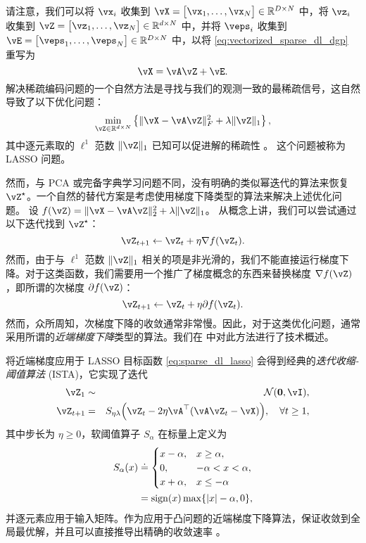 \documentclass[../../book-main.tex]{subfiles}
\begin{document}
请注意，我们可以将 \(\vx_{i}\) 收集到 \(\vX = \mat{\vx_{1}, \dots, \vx_{N}} \in \R^{D \times N}\) 中，将 \(\vz_{i}\) 收集到 \(\vZ = \mat{\vz_{1}, \dots, \vz_{N}} \in \R^{d  \times N}\) 中，并将 \(\veps_{i}\) 收集到 \(\vE = \mat{\veps_{1}, \dots, \veps_{N}} \in \R^{D \times N}\) 中，以将 \eqref{eq:vectorized_sparse_dl_dgp} 重写为
\begin{equation}\label{eq:sparse_dl_dgp}
    \vX = \vA\vZ + \vE.
\end{equation}
解决稀疏编码问题的一个自然方法是寻找与我们的观测一致的最稀疏信号，这自然导致了以下优化问题：
\begin{equation}\label{eq:sparse_dl_lasso}
    \min_{\vZ \in \R^{d \times N}}\bc{\norm{\vX - \vA\vZ}_{F}^{2} + \lambda \norm{\vZ}_{1}},
\end{equation}
其中逐元素取的 \(\ell^1\) 范数 \(\norm{\vZ}_{1}\) 已知可以促进解的稀疏性 \cite{Wright-Ma-2022}。
这个问题被称为 LASSO 问题。

然而，与 PCA 或完备字典学习问题不同，没有明确的类似幂迭代的算法来恢复 \(\vZ^{\star}\)。一个自然的替代方案是考虑使用梯度下降类型的算法来解决上述优化问题。
设 \(f(\vZ) = \norm{\vX - \vA\vZ}_{2}^{2} + \lambda \norm{\vZ}_{1}\)。
从概念上讲，我们可以尝试通过以下迭代找到 \(\vZ^{\star}\)：
\begin{equation}
    \vZ_{t+1} \leftarrow \vZ_t + \eta \nabla f(\vZ_t).
\end{equation}
然而，由于与 \(\ell^1\) 范数 \(\norm{\vZ}_{1}\) 相关的项是非光滑的，我们不能直接运行梯度下降。对于这类函数，我们需要用一个推广了梯度概念的东西来替换梯度 \(\nabla f(\vZ)\)，即所谓的次梯度 \(\partial f(\vZ)\)：
\begin{equation}
    \vZ_{t+1} \leftarrow \vZ_t + \eta \partial f(\vZ_t).
\end{equation}
然而，众所周知，次梯度下降的收敛通常非常慢。因此，对于这类优化问题，通常采用所谓的\textit{近端梯度下降}类型的算法。我们在  中对此方法进行了技术概述。

将近端梯度应用于 LASSO 目标函数 \eqref{eq:sparse_dl_lasso} 会得到经典的\textit{迭代收缩-阈值算法} (ISTA)，它实现了迭代
\begin{eqnarray}
    \vZ_{1} &\sim& \dNorm(\vzero, \vI), \\
    \vZ_{t + 1} &=& S_{\eta\lambda}\rp{\vZ_{t} - 2\eta \vA^{\top}(\vA\vZ_{t} - \vX)}, \quad \forall t \geq 1,\label{eq:ista_update}
\end{eqnarray}
其中步长为 \(\eta \geq 0\)，软阈值算子 \(S_{\alpha}\) 在标量上定义为
\begin{align}
    S_{\alpha}(x) &
    \doteq \begin{cases}x - \alpha, & x \geq \alpha, \\ 0,
    & -\alpha < x < \alpha, \\ x + \alpha, & x \leq -\alpha\end{cases}
    \\
    &=
    \sign(x) \max \set{\abs{x} - \alpha, 0},
\end{align}
并逐元素应用于输入矩阵。作为应用于凸问题的近端梯度下降算法，保证收敛到全局最优解，并且可以直接推导出精确的收敛速率 \cite{Wright-Ma-2022}。
\end{document}
